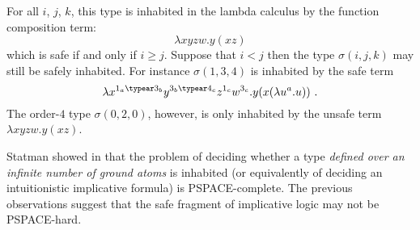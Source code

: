 For all $i$, $j$, $k$, this type is inhabited in the lambda calculus by the function composition term:
$$\lambda x y z w . y (x z) $$
which is safe if and only if $i\geq j$. Suppose that $i<j$ then the type
$\sigma(i,j,k)$ may still be safely inhabited. For instance
$\sigma(1,3,4)$ is inhabited by the safe term
$$ \lambda x^{1_a \typear 3_b} y^{3_b \typear 4_c} z^{1_c} w^{3_c} . y (x (\lambda u^a . u)) \ .$$
The order-$4$ type $\sigma(0,2,0)$, however, is only inhabited by the unsafe term $\lambda x y z w. y (x z) $.


Statman showed in \cite{Statman1979} that the problem of deciding
whether a type \emph{defined over an infinite number of ground
atoms} is inhabited (or equivalently of deciding an intuitionistic
implicative formula) is PSPACE-complete. The previous observations suggest that the safe
fragment of implicative logic may not be PSPACE-hard.
